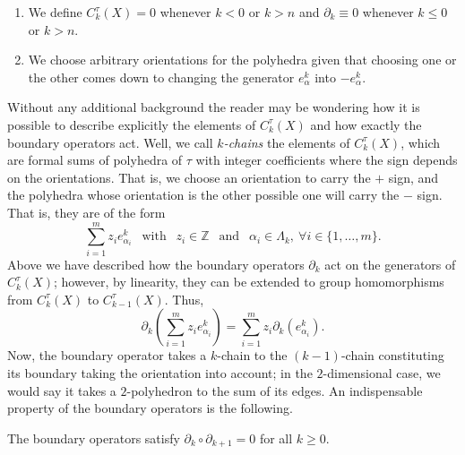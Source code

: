 \begin{remark}\hfill
    \begin{enumerate}[label=(\roman*)]
        \item We define $C^{\tau}_k(X) = 0$ whenever $k<0$ or $k>n$ and $\partial_k \equiv 0$ whenever $k\le 0$ or $k>n$.
        \item We choose arbitrary orientations for the polyhedra given that choosing one or the other comes down to changing the generator $e^k_{\alpha}$ into $-e^k_{\alpha}$.
    \end{enumerate}
\end{remark}

\bigskip

Without any additional background the reader may be wondering how it is possible to describe explicitly the elements of $C^{\tau}_k(X)$ and how exactly the boundary operators act. Well, we call \textit{$k$-chains} the elements of $C^{\tau}_k(X)$, which are formal sums of polyhedra of $\tau$ with integer coefficients where the sign depends on the orientations. That is, we choose an orientation to carry the $+$ sign, and the polyhedra whose orientation is the other possible one will carry the $-$ sign. That is, they are of the form
\begin{equation*}
    \sum_{i=1}^m z_i e^k_{\alpha_i} ~~\text{ with }~~ z_i \in \mathbb{Z} ~~\text{ and }~~ \alpha_i \in \Lambda_k, ~\forall i\in \{1,\dots, m\}.
\end{equation*}
Above we have described how the boundary operators $\partial_k$ act on the generators of $C^{\tau}_k(X)$; however, by linearity, they can be extended to group homomorphisms from $C^{\tau}_k(X)$ to $C^{\tau}_{k-1}(X)$. Thus,
\begin{equation*}
    \partial_k \left( \sum_{i=1}^m z_i e^k_{\alpha_i} \right) = \sum_{i=1}^m z_i \partial_k (e^k_{\alpha_i}).
\end{equation*}
Now, the boundary operator takes a $k$-chain to the $(k-1)$-chain constituting its boundary taking the orientation into account; in the $2$-dimensional case, we would say it takes a $2$-polyhedron to the sum of its edges. An indispensable property of the boundary operators is the following.

\begin{proposition}
\label{prop_bordes}
    The boundary operators satisfy $\partial_{k}\circ\partial_{k+1}=0$ for all $k\ge 0$.
\end{proposition}

